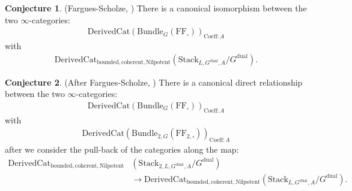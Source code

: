 \documentclass[12pt]{book}
\theoremstyle{definition}
\newtheorem{conjecture}{Conjecture}
\begin{document}
\begin{conjecture} (Fargues-Scholze, \cite[Chapter I, Conjecture 10.2]{LPFS})
There is a canonical isomorphism between the two $\infty$-categories:
\begin{align}
\mathrm{DerivedCat}(\mathrm{Bundle}_{G}(\mathrm{FF}_{\square}))_{\mathrm{Coeff}: A}
\end{align}
with
\begin{align}
\mathrm{DerivedCat}_{\mathrm{bounded},\mathrm{coherent},\mathrm{Nilpotent}}(\mathrm{Stack}_{L,{G}^\mathrm{dual},A}/{G}^\mathrm{dual}).
\end{align}
\end{conjecture}


\begin{conjecture} (After Fargues-Scholze, \cite[Chapter I, Conjecture 10.2]{LPFS})
There is a canonical direct relationship between the two $\infty$-categories:
\begin{align}
\mathrm{DerivedCat}(\mathrm{Bundle}_{G}(\mathrm{FF}_{\square}))_{\mathrm{Coeff}: A}
\end{align}
with 
\begin{align}
\mathrm{DerivedCat}(\mathrm{Bundle}_{2,G}(\mathrm{FF}_{2,\square}))_{\mathrm{Coeff}: A}
\end{align}
after we consider the pull-back of the categories along the map:
\begin{align}
\mathrm{DerivedCat}_{\mathrm{bounded},\mathrm{coherent},\mathrm{Nilpotent}}&(\mathrm{Stack}_{2,L,{G}^\mathrm{dual},A}/{G}^\mathrm{dual})\\&\rightarrow \mathrm{DerivedCat}_{\mathrm{bounded},\mathrm{coherent},\mathrm{Nilpotent}}(\mathrm{Stack}_{L,{G}^\mathrm{dual},A}/{G}^\mathrm{dual}).
\end{align}
\end{conjecture}
\end{document}
